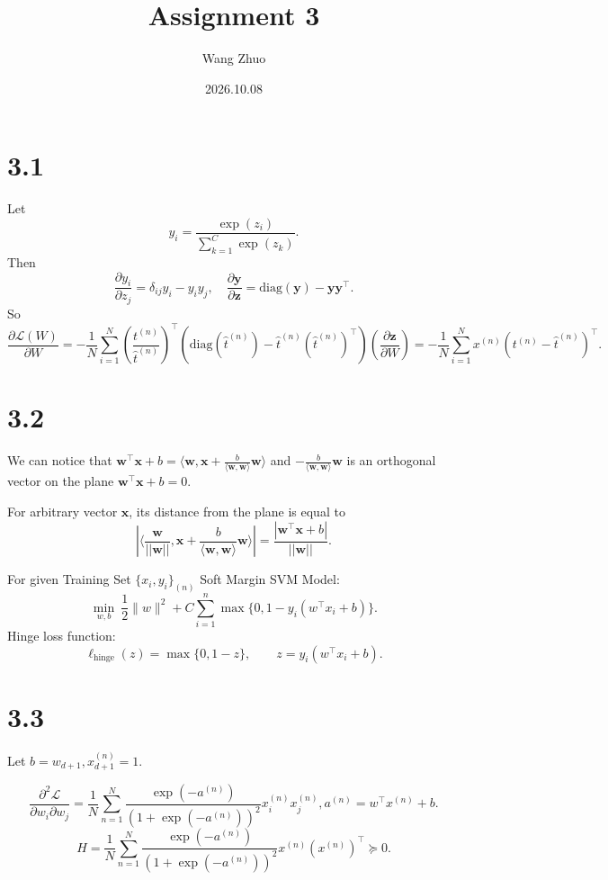 \documentclass{article}
\title{Assignment 3}
\author{Wang Zhuo}
\date{2026.10.08}
\begin{document}
\maketitle

\section{3.1}

Let 
\[y_i=\frac{\exp(z_i)}{\sum^C_{k=1}\exp(z_k)}.\]
Then
\[\frac{\partial y_i}{\partial z_j}=\delta_{ij}y_i-y_i y_j,\quad \frac{\partial \mathbf{y}}{\partial \mathbf{z}}=\text{diag}(\mathbf{y})-\mathbf{y}\mathbf{y}^\top.\]
So
\[\frac{\partial \mathcal{L}(W)}{\partial W}=-\frac{1}{N}\sum^N_{i=1}(\frac{t^{(n)}}{\hat{t}^{(n)}})^\top(\text{diag}(\hat{t}^{(n)})-\hat{t}^{(n)}(\hat{t}^{(n)})^\top)(\frac{\partial \mathbf{z}}{\partial W})=-\frac{1}{N}\sum^N_{i=1}x^{(n)}(t^{(n)}-\hat{t}^{(n)})^\top.\]

\section{3.2}

We can notice that $\mathbf{w}^\top\mathbf{x}+b=\langle \mathbf{w},\mathbf{x}+\frac{b}{\langle\mathbf{w},\mathbf{w}\rangle}\mathbf{w}\rangle$ and $-\frac{b}{\langle\mathbf{w},\mathbf{w}\rangle}\mathbf{w}$ is an orthogonal vector on the plane $\mathbf{w}^\top\mathbf{x}+b=0$. 

For arbitrary vector $\mathbf{x}$, its distance from the plane is equal to 
\[|\langle \frac{\mathbf{w}}{||\mathbf{w}||},\mathbf{x}+\frac{b}{\langle\mathbf{w},\mathbf{w}\rangle}\mathbf{w}\rangle|=\frac{|\mathbf{w}^\top\mathbf{x}+b|}{||\mathbf{w}||}.\]

For given Training Set $\{x_i,y_i\}_{(n)}$
Soft Margin SVM Model:
\[
\min_{w,b}\ \frac{1}{2}\|w\|^2+C\sum_{i=1}^{n}\max\{0,1-y_i(w^\top x_i+b)\}.
\]
Hinge loss function:
\[
\ell_{\mathrm{hinge}}(z)=\max\{0,1-z\},\qquad z=y_i(w^\top x_i+b).
\]

\section{3.3}

Let $b=w_{d+1},x^{(n)}_{d+1}=1.$

\[\frac{\partial^2\mathcal{L}}{\partial w_i\partial w_j}=\frac{1}{N}\sum^N_{n=1}\frac{\exp(-a^{(n)})}{(1+\exp(-a^{(n)}))^2}x^{(n)}_ix^{(n)}_j,a^{(n)}=w^\top x^{(n)}+b.\]
\[H=\frac{1}{N}\sum^N _{n=1}\frac{\exp(-a^{(n)})}{(1+\exp(-a^{(n)}))^2}x^{(n)}(x^{(n)})^{\top}\succeq0 .\]
\end{document}
